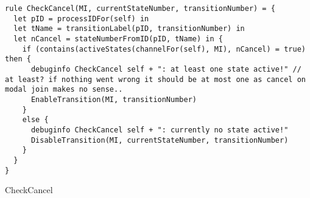 \begin{listing}[H]
\begin{verbatim}
rule CheckCancel(MI, currentStateNumber, transitionNumber) = {
  let pID = processIDFor(self) in
  let tName = transitionLabel(pID, transitionNumber) in
  let nCancel = stateNumberFromID(pID, tName) in {
    if (contains(activeStates(channelFor(self), MI), nCancel) = true) then {
      debuginfo CheckCancel self + ": at least one state active!" // at least? if nothing went wrong it should be at most one as cancel on modal join makes no sense..
      EnableTransition(MI, transitionNumber)
    }
    else {
      debuginfo CheckCancel self + ": currently no state active!"
      DisableTransition(MI, currentStateNumber, transitionNumber)
    }
  }
}
\end{verbatim}
\caption{CheckCancel}
\label{lst:asm:CheckCancel}
\end{listing}




